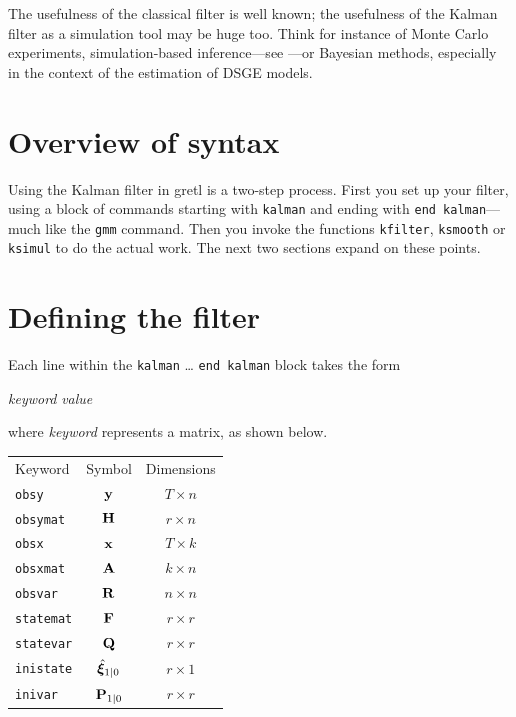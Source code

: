 The usefulness of the classical filter is well known; the usefulness
of the Kalman filter as a simulation tool may be huge too. Think for
instance of Monte Carlo experiments, simulation-based inference---see
\cite{gourieroux96}---or Bayesian methods, especially in the
context of the estimation of DSGE models.

\section{Overview of syntax}

Using the Kalman filter in gretl is a two-step process.  First you set
up your filter, using a block of commands starting with
\texttt{kalman} and ending with \texttt{end kalman}---much like the
\texttt{gmm} command.  Then you invoke the functions \texttt{kfilter},
\texttt{ksmooth} or \texttt{ksimul} to do the actual work.  The next
two sections expand on these points.

\section{Defining the filter}

Each line within the \texttt{kalman} \dots{} \texttt{end kalman} block 
takes the form

\vspace{1ex}
\textsl{keyword} \textsl{value}
\vspace{1ex}

\noindent where \textsl{keyword} represents a matrix, as shown 
below.

\begin{center}
\begin{tabular}{lcc}
Keyword & Symbol & Dimensions \\[6pt]
\texttt{obsy}     & $\mathbf{y}$         & $T \times n$ \\
\texttt{obsymat}  & $\mathbf{H}$         & $r \times n$ \\
\texttt{obsx}     & $\mathbf{x}$           & $T \times k$ \\
\texttt{obsxmat}  & $\mathbf{A}$        & $k \times n$ \\ 
\texttt{obsvar}   & $\mathbf{R}$         & $n \times n$ \\
\texttt{statemat} & $\mathbf{F}$       & $r \times r$ \\
\texttt{statevar} & $\mathbf{Q}$         & $r \times r$ \\
\texttt{inistate} & $\hat{\bm{\xi}}_{1|0}$  & $r \times 1$ \\
\texttt{inivar}   & $\mathbf{P}_{1|0}$ & $r \times r$ \\
\end{tabular}
\end{center}

